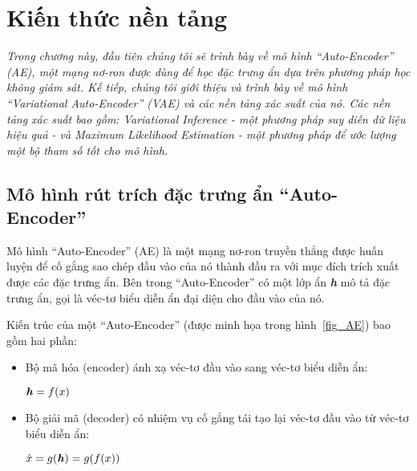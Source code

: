\chapter{Kiến thức nền tảng}
\label{Chapter2}
\graphicspath{{Chapter2/Chapter2Figs}}
\justifying

\setlength{\parindent}{6.5ex}
\textit{Trong chương này, đầu tiên chúng tôi sẽ trình bày về mô hình 
``Auto-Encoder'' (AE), một mạng nơ-ron được dùng để học đặc trưng ẩn dựa trên
phương pháp học không giám sát.
Kế tiếp, chúng tôi giới thiệu và trình bày về mô hình ``Variational Auto-Encoder'' (VAE) và các nền tảng xác suất của nó. Các nền tảng xác suất bao gồm: Variational Inference - một phương pháp suy diễn dữ liệu hiệu quả - và Maximum Likelihood Estimation - một phương pháp để ước lượng một bộ tham số tốt cho mô hình.
}



\section{Mô hình rút trích đặc trưng ẩn ``Auto-Encoder''}
\label{chap2/sec1}
Mô hình ``Auto-Encoder'' (AE) là một mạng nơ-ron truyền thẳng được huấn luyện
để cố gắng sao chép đầu vào của nó thành đầu ra với mục đích trích xuất được các đặc trưng ẩn. Bên trong ``Auto-Encoder''
có một lớp ẩn \textbf{\textit{h}} mô tả đặc trưng ẩn, gọi là véc-tơ biểu diễn ẩn đại diện cho đầu vào của nó.

Kiến trúc của một ``Auto-Encoder'' (được minh họa trong hình~\ref{fig_AE}) bao gồm hai phần:
\begin{itemize}
    \item Bộ mã hóa (encoder) ánh xạ véc-tơ đầu vào sang véc-tơ biểu diễn ẩn: 
    \begin{center}
        \begin{math}
            \centering
            \textbf{\textit{h}} = f(x)
        \end{math} 
            
    \end{center}
    \item Bộ giải mã (decoder) có nhiệm vụ cố gắng tái tạo lại véc-tơ đầu vào từ véc-tơ biểu diễn ẩn:
    \begin{center}
        \begin{math}
            \hat{x} = g(\textbf{\textit{h}}) = g(f(x))
        \end{math}
    \end{center}
\end{itemize}

